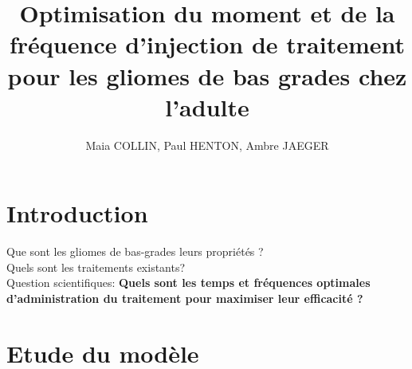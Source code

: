 \documentclass[12pt]{article}
\title{Optimisation du moment et de la fréquence d'injection de traitement pour les gliomes de bas grades chez l'adulte} %
\author{Maia COLLIN, Paul HENTON, Ambre JAEGER} %
\begin{document}
\maketitle %
     
\section{Introduction}
Que sont les gliomes de bas-grades leurs propriétés ?\\
Quels sont les traitements existants?\\
Question scientifiques: \textbf{Quels sont les temps et fréquences optimales d'administration du traitement pour maximiser leur efficacité ?}


\section{Etude du modèle}
\end{document}
